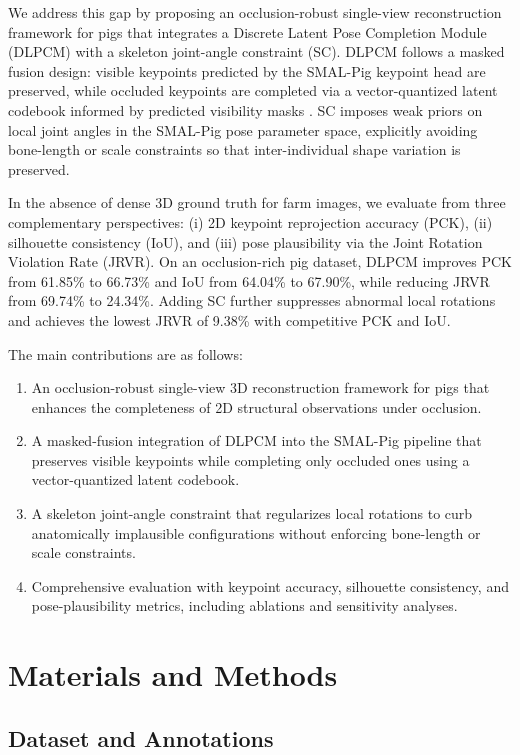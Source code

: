 \documentclass[computers,article,submit,pdftex,moreauthors]{Definitions/mdpi}
\begin{document}
We address this gap by proposing an occlusion-robust single-view reconstruction framework for pigs that integrates a Discrete Latent Pose Completion Module (DLPCM) with a skeleton joint-angle constraint (SC). DLPCM follows a masked fusion design: visible keypoints predicted by the SMAL-Pig keypoint head are preserved, while occluded keypoints are completed via a vector-quantized latent codebook informed by predicted visibility masks \cite{ref28}. SC imposes weak priors on local joint angles in the SMAL-Pig pose parameter space, explicitly avoiding bone-length or scale constraints so that inter-individual shape variation is preserved.

In the absence of dense 3D ground truth for farm images, we evaluate from three complementary perspectives: (i) 2D keypoint reprojection accuracy (PCK), (ii) silhouette consistency (IoU), and (iii) pose plausibility via the Joint Rotation Violation Rate (JRVR). On an occlusion-rich pig dataset, DLPCM improves PCK from 61.85\% to 66.73\% and IoU from 64.04\% to 67.90\%, while reducing JRVR from 69.74\% to 24.34\%. Adding SC further suppresses abnormal local rotations and achieves the lowest JRVR of 9.38\% with competitive PCK and IoU.

The main contributions are as follows:

\begin{enumerate}
  \item An occlusion-robust single-view 3D reconstruction framework for pigs that enhances the completeness of 2D structural observations under occlusion.
  \item A masked-fusion integration of DLPCM into the SMAL-Pig pipeline that preserves visible keypoints while completing only occluded ones using a vector-quantized latent codebook.
  \item A skeleton joint-angle constraint that regularizes local rotations to curb anatomically implausible configurations without enforcing bone-length or scale constraints.
  \item Comprehensive evaluation with keypoint accuracy, silhouette consistency, and pose-plausibility metrics, including ablations and sensitivity analyses.
\end{enumerate}

\section{Materials and Methods}\label{sec:materials}

\subsection{Dataset and Annotations}\label{sec:dataset}
\end{document}
